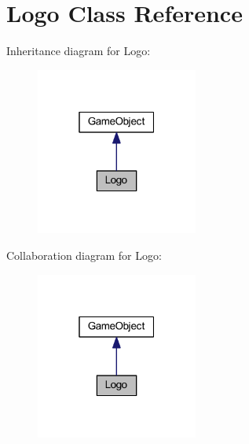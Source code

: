 \hypertarget{class_logo}{\section{Logo Class Reference}
\label{class_logo}
}


Inheritance diagram for Logo\+:\nopagebreak
\begin{figure}[H]
\begin{center}
\leavevmode
\includegraphics[width=151pt]{class_logo__inherit__graph}
\end{center}
\end{figure}


Collaboration diagram for Logo\+:\nopagebreak
\begin{figure}[H]
\begin{center}
\leavevmode
\includegraphics[width=151pt]{class_logo__coll__graph}
\end{center}
\end{figure}
